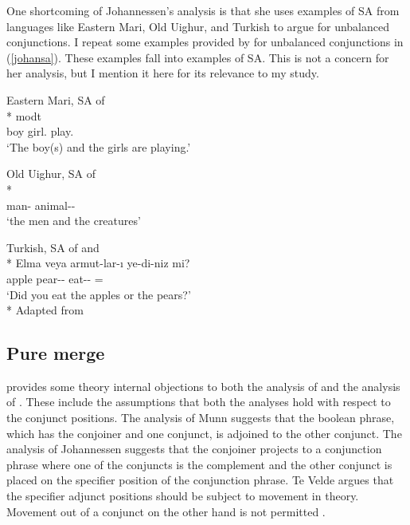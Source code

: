 One shortcoming of Johannessen's analysis is that she uses examples of SA from languages like Eastern Mari, Old Uighur, and Turkish to argue for unbalanced conjunctions. I repeat some examples provided by \cite{johannessen1998coordination} for unbalanced conjunctions in (\ref{johansa}). These examples fall into examples of SA. This is not a concern for her analysis, but I mention it here for its relevance to my study.

\begin{exe}
\ex \label{johansa}
\begin{xlist}
    \ex Eastern Mari, SA of {\Pl}\\* 
     mod\textschwa t \\ 
    boy {\And} girl.{\Pl} play.{\Tpl} \\
    \glt `The boy(s) and the girls are playing.'  
    
    \ex Old Uighur, SA of {\Acc}\\*
     \\ 
    man-{\Pl} animal-{\Pl}-{\Acc} \\
    \glt `the men and the creatures'
    
    \ex Turkish, SA of {\Pl} and {\Acc}\\*
    \gll Elma veya armut-lar-ı ye-di-niz mi? \\ 
    apple {\Or} pear-{\Pl}-{\Acc} eat-{\Pst}-{\Spl} ={\Q} \\
    \glt `Did you eat the apples or the pears?'\\*
    \hfill Adapted from \cite{johannessen1998coordination}
\end{xlist}

\end{exe}

\subsection{Pure merge}

\cite{te2005deriving} provides some theory internal objections to both the analysis of \cite{munn1993topics} and the analysis of \cite{johannessen1998coordination}. These include the assumptions that both the analyses hold with respect to the conjunct positions. The analysis of Munn suggests that the boolean phrase, which has the conjoiner and one conjunct, is adjoined to the other conjunct. The analysis of Johannessen suggests that the conjoiner projects to a conjunction phrase where one of the conjuncts is the complement and the other conjunct is placed on the specifier position of the conjunction phrase. Te Velde argues that the specifier adjunct positions should be subject to movement in theory. Movement out of a conjunct on the other hand is not permitted \citep{ross1967constraints}.  

